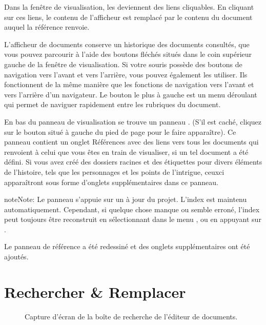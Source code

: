 \documentclass[a4paper,11pt,french]{sphinxmanual}
\begin{document}
\sphinxAtStartPar
Dans la fenêtre de visualisation, les {\hyperref[\detokenize{int_glossary:term-Reference}]{}} deviennent des liens cliquables. En cliquant sur ces liens, le contenu de l’afficheur est remplacé par le contenu du document auquel la référence renvoie.

\sphinxAtStartPar
L’afficheur de documents conserve un historique des documents consultés, que vous pouvez parcourir à l’aide des boutons fléchés situés dans le coin supérieur gauche de la fenêtre de visualisation. Si votre souris possède des boutons de navigation vers l’avant et vers l’arrière, vous pouvez également les utiliser. Ils fonctionnent de la même manière que les fonctions de navigation vers l’avant et vers l’arrière d’un navigateur. Le bouton le plus à gauche est un menu déroulant qui permet de naviguer rapidement entre les rubriques du document.

\sphinxAtStartPar
En bas du panneau de visualisation se trouve un panneau . (S’il est caché, cliquez sur le bouton situé à gauche du pied de page pour le faire apparaître). Ce panneau contient un onglet Références avec des liens vers tous les documents qui renvoient à celui que vous êtes en train de visualiser, si un tel document a été défini. Si vous avez créé des dossiers racines et des étiquettes pour divers éléments de l’histoire, tels que les personnages et les points de l’intrigue, ceux\sphinxhyphen{}ci apparaîtront sous forme d’onglets supplémentaires dans ce panneau.

\begin{sphinxadmonition}{note}{Note:}
\sphinxAtStartPar
Le panneau  s’appuie sur un {\hyperref[\detokenize{int_glossary:term-Project-Index}]{}} à jour du projet. L’index est maintenu automatiquement. Cependant, si quelque chose manque ou semble erroné, l’index peut toujours être reconstruit en sélectionnant  dans le menu , ou en appuyant sur .
\end{sphinxadmonition}

\sphinxAtStartPar
{}Le panneau de référence a été redessiné et des onglets supplémentaires ont été ajoutés.


\section{Rechercher \& Remplacer}
\label{\detokenize{usage_writing:search-replace}}\label{\detokenize{usage_writing:a-ui-edit-search}}
\begin{figure}[htbp]
\centering
\capstart

\noindent{}
\caption{Capture d’écran de la boîte de recherche de l’éditeur de documents.}\label{\detokenize{usage_writing:id3}}\end{figure}
\end{document}
